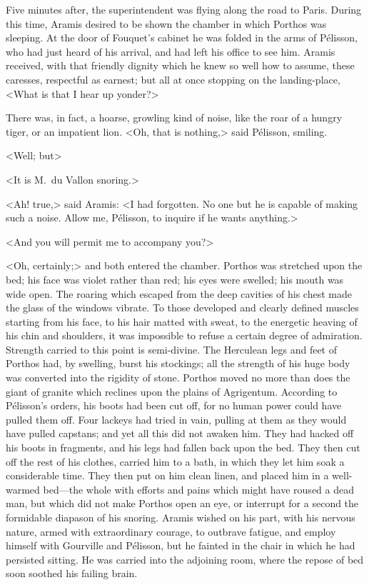 Five minutes after, the superintendent was flying along the road to Paris. During this time, Aramis desired to be shown the chamber in which Porthos was sleeping. At the door of Fouquet's cabinet he was folded in the arms of Pélisson, who had just heard of his arrival, and had left his office to see him. Aramis received, with that friendly dignity which he knew so well how to assume, these caresses, respectful as earnest; but all at once stopping on the landing-place, <What is that I hear up yonder?>

There was, in fact, a hoarse, growling kind of noise, like the roar of a hungry tiger, or an impatient lion. <Oh, that is nothing,> said Pélisson, smiling.

<Well; but\longdash>

<It is M.~du Vallon snoring.>

<Ah! true,> said Aramis: <I had forgotten. No one but he is capable of making such a noise. Allow me, Pélisson, to inquire if he wants anything.>

<And you will permit me to accompany you?>

<Oh, certainly;> and both entered the chamber. Porthos was stretched upon the bed; his face was violet rather than red; his eyes were swelled; his mouth was wide open. The roaring which escaped from the deep cavities of his chest made the glass of the windows vibrate. To those developed and clearly defined muscles starting from his face, to his hair matted with sweat, to the energetic heaving of his chin and shoulders, it was impossible to refuse a certain degree of admiration. Strength carried to this point is semi-divine. The Herculean legs and feet of Porthos had, by swelling, burst his stockings; all the strength of his huge body was converted into the rigidity of stone. Porthos moved no more than does the giant of granite which reclines upon the plains of Agrigentum. According to Pélisson's orders, his boots had been cut off, for no human power could have pulled them off. Four lackeys had tried in vain, pulling at them as they would have pulled capstans; and yet all this did not awaken him. They had hacked off his boots in fragments, and his legs had fallen back upon the bed. They then cut off the rest of his clothes, carried him to a bath, in which they let him soak a considerable time. They then put on him clean linen, and placed him in a well-warmed bed—the whole with efforts and pains which might have roused a dead man, but which did not make Porthos open an eye, or interrupt for a second the formidable diapason of his snoring. Aramis wished on his part, with his nervous nature, armed with extraordinary courage, to outbrave fatigue, and employ himself with Gourville and Pélisson, but he fainted in the chair in which he had persisted sitting. He was carried into the adjoining room, where the repose of bed soon soothed his failing brain. 